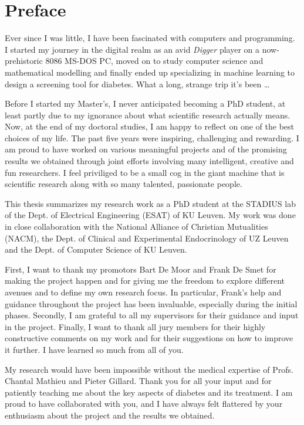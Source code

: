 \chapter*{Preface}                                  \label{ch:preface}

Ever since I was little, I have been fascinated with computers and programming. I started my journey in the digital realm as an avid \emph{Digger} player on a now-prehistoric 8086 MS-DOS PC, moved on to study computer science and mathematical modelling and finally ended up specializing in machine learning to design a screening tool for diabetes. What a long, strange trip it's been \ldots

Before I started my Master's, I never anticipated becoming a PhD student, at least partly due to my ignorance about what scientific research actually means. Now, at the end of my doctoral studies, I am happy to reflect on one of the best choices of my life. The past five years were inspiring, challenging and rewarding. I am proud to have worked on various meaningful projects and of the promising results we obtained through joint efforts involving many intelligent, creative and fun researchers. I feel priviliged to be a small cog in the giant machine that is scientific research along with so many talented, passionate people.

This thesis summarizes my research work as a PhD student at the STADIUS lab of the Dept. of Electrical Engineering (ESAT) of KU Leuven. My work was done in close collaboration with the National Alliance of Christian Mutualities (NACM), the Dept. of Clinical and Experimental Endocrinology of UZ Leuven and the Dept. of Computer Science of KU Leuven. 

First, I want to thank my promotors Bart De Moor and Frank De Smet for making the project happen and for giving me the freedom to explore different avenues and to define my own research focus. In particular, Frank's help and guidance throughout the project has been invaluable, especially during the initial phases. Secondly, I am grateful to all my supervisors for their guidance and input in the project. Finally, I want to thank all jury members for their highly constructive comments on my work and for their suggestions on how to improve it further. I have learned so much from all of you.

My research would have been impossible without the medical expertise of Profs. Chantal Mathieu and Pieter Gillard. Thank you for all your input and for patiently teaching me about the key aspects of diabetes and its treatment. I am proud to have collaborated with you, and I have always felt flattered by your enthusiasm about the project and the results we obtained.

